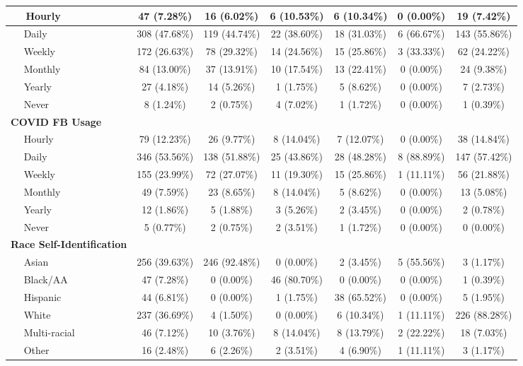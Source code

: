 \documentclass[12pt,letterpaper]{article}
\begin{document}
\begin{enumerate}
\begin{adjustbox}{angle=90}
{\begin{tabular}{l|c|c|c|c|c|c}
 \hline
 ~~ Hourly & 47 (7.28\%) & 16 (6.02\%) & 6 (10.53\%) & 6 (10.34\%) & 0 (0.00\%) & 19 (7.42\%)\\
 \hline
 ~~ Daily & 308 (47.68\%) & 119 (44.74\%) & 22 (38.60\%) & 18 (31.03\%) & 6 (66.67\%) & 143 (55.86\%)\\
 \hline
 ~~ Weekly & 172 (26.63\%) & 78 (29.32\%) & 14 (24.56\%) & 15 (25.86\%) & 3 (33.33\%) & 62 (24.22\%)\\
 \hline
 ~~ Monthly & 84 (13.00\%) & 37 (13.91\%) & 10 (17.54\%) & 13 (22.41\%) & 0 (0.00\%) & 24 (9.38\%)\\
 \hline
 ~~ Yearly & 27 (4.18\%) & 14 (5.26\%) & 1 (1.75\%) & 5 (8.62\%) & 0 (0.00\%) & 7 (2.73\%)\\
 \hline
 ~~ Never & 8 (1.24\%) & 2 (0.75\%) & 4 (7.02\%) & 1 (1.72\%) & 0 (0.00\%) & 1 (0.39\%)\\
 \hline
 \bf{COVID FB Usage} & ~ & ~ & ~ & ~ & ~ & ~\\
 \hline
 ~~ Hourly & 79 (12.23\%) & 26 (9.77\%) & 8 (14.04\%) & 7 (12.07\%) & 0 (0.00\%) & 38 (14.84\%)\\
 \hline
 ~~ Daily & 346 (53.56\%) & 138 (51.88\%) & 25 (43.86\%) & 28 (48.28\%) & 8 (88.89\%) & 147 (57.42\%)\\
 \hline
 ~~ Weekly & 155 (23.99\%) & 72 (27.07\%) & 11 (19.30\%) & 15 (25.86\%) & 1 (11.11\%) & 56 (21.88\%)\\
 \hline
 ~~ Monthly & 49 (7.59\%) & 23 (8.65\%) & 8 (14.04\%) & 5 (8.62\%) & 0 (0.00\%) & 13 (5.08\%)\\
 \hline
 ~~ Yearly & 12 (1.86\%) & 5 (1.88\%) & 3 (5.26\%) & 2 (3.45\%) & 0 (0.00\%) & 2 (0.78\%)\\
 \hline
 ~~ Never & 5 (0.77\%) & 2 (0.75\%) & 2 (3.51\%) & 1 (1.72\%) & 0 (0.00\%) & 0 (0.00\%)\\
 \hline
 \bf{Race Self-Identification} & ~ & ~ & ~ & ~ & ~ & ~\\
 \hline
 ~~ Asian & 256 (39.63\%) & 246 (92.48\%) & 0 (0.00\%) & 2 (3.45\%) & 5 (55.56\%) & 3 (1.17\%)\\
 \hline
 ~~ Black/AA & 47 (7.28\%) & 0 (0.00\%) & 46 (80.70\%) & 0 (0.00\%) & 0 (0.00\%) & 1 (0.39\%)\\
 \hline
 ~~ Hispanic & 44 (6.81\%) & 0 (0.00\%) & 1 (1.75\%) & 38 (65.52\%) & 0 (0.00\%) & 5 (1.95\%)\\
 \hline
 ~~ White & 237 (36.69\%) & 4 (1.50\%) & 0 (0.00\%) & 6 (10.34\%) & 1 (11.11\%) & 226 (88.28\%)\\
 \hline
 ~~ Multi-racial & 46 (7.12\%) & 10 (3.76\%) & 8 (14.04\%) & 8 (13.79\%) & 2 (22.22\%) & 18 (7.03\%)\\
 \hline
 ~~ Other & 16 (2.48\%) & 6 (2.26\%) & 2 (3.51\%) & 4 (6.90\%) & 1 (11.11\%) & 3 (1.17\%)\\
 \hline
 \end{tabular}}
 \end{adjustbox}
 

\end{enumerate}
\end{document}
